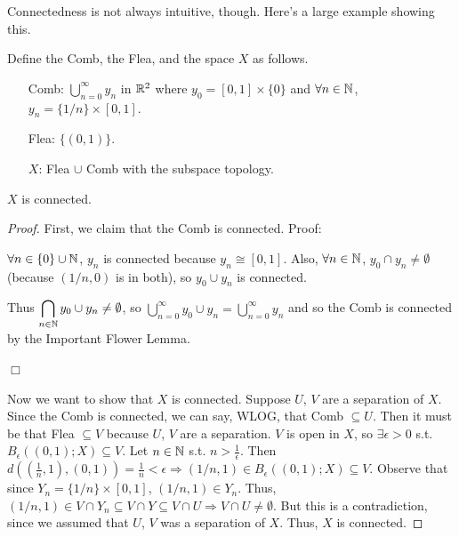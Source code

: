 Connectedness is not always intuitive, though. Here's a large example showing this.

Define the Comb, the Flea, and the space $X$ as follows. 
\begin{itemize}
\item[Comb:] ${\displaystyle\bigcup_{n=0}^{\infty}y_n}$ in $\mathbb R^2$ where $y_0 = [0,1]\times\{0\}$ and $\forall n\in \mathbb N$, $y_n = \{1/n\} \times [0,1]$. 
\item[Flea:] $\{(0,1)\}$. 
\item[$X$:] Flea $\cup$ Comb with the subspace topology. 
\end{itemize}
\begin{example}
$X$ is connected. 
\end{example}
\begin{proof}
First, we claim that the Comb is connected. Proof: 

$\forall n \in \{0\} \cup \mathbb N$, $y_n$ is connected because $y_n \cong [0,1]$. Also, $\forall n \in \mathbb N$, $y_0 \cap y_n \neq \emptyset$ (because $(1/n, 0)$ is in both), so $y_0 \cup y_n$ is connected. 

Thus ${\displaystyle\bigcap_{n\in \mathbb N}y_0 \cup y_n} \neq \emptyset$, so ${\displaystyle\bigcup_{n=0}^{\infty}y_0 \cup y_n} = {\displaystyle\bigcup_{n=0}^{\infty}y_n} $ and so the Comb is connected by the Important Flower Lemma. 
\begin{flushright}
$\Box$ 
\end{flushright}

Now we want to show that $X$ is connected. Suppose $U$, $V$ are a separation of $X$. Since the Comb is connected, we can say, WLOG, that Comb $\subseteq U$. Then it must be that Flea $\subseteq V$ because $U$, $V$ are a separation. $V$ is open in $X$, so $\exists \epsilon > 0$ s.t. $B_{\epsilon}((0,1); X) \subseteq V$. Let $n \in \mathbb N$ s.t. $n > \frac{1}{\epsilon}$. Then $d((\frac{1}{n}, 1), (0, 1)) = \frac{1}{n} < \epsilon \Rightarrow (1/n, 1) \in B_{\epsilon}((0,1); X) \subseteq V$. Observe that since $Y_n = \{1/n\} \times [0,1]$, $(1/n, 1) \in Y_n$. Thus, $(1/n, 1) \in V \cap Y_n \subseteq V \cap Y \subseteq V \cap U \Rightarrow V \cap U \neq \emptyset$. But this is a contradiction, since we assumed that $U$, $V$ was a separation of $X$. Thus, $X$ is connected. 
\end{proof}

